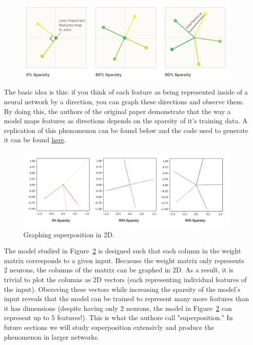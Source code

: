 \documentclass{article} %
\begin{document}
\begin{figure}[h]
    \centering
    \includegraphics[width=0.55\linewidth]{section_1/images/section1_anthropic_graphic_.png}
    \captionsetup{font=footnotesize} %
    \label{fig:section1_anthropic}
\end{figure}

The basic idea is this: if you think of each feature as being represented inside of a
neural network by a direction, you can graph these directions and observe them.
By doing this, the authors of the original paper demonstrate that the way
a model maps features as directions depends on the sparsity of it's training data.
A replication of this phenomenon can be found below and the code used to 
generate it can be found 
\href{https://github.com/zroe1/toy_models_of_superposition/blob/main/section_1/section_1.ipynb}{here}.\\ 

\begin{figure}[h]
    \centering
    \includegraphics[width=0.6\linewidth]{section_1/images/section1_replicated_graphic.png}
    \captionsetup{font=footnotesize} %
    \caption{Graphing superposition in 2D.}
    \label{fig:section1_replication}
\end{figure}

The model studied in  Figure~\ref{fig:section1_replication} is designed such that 
each column in the weight matrix corresponds to a  given input. Becasuse the weight
matrix only represents 2 neurons, the columns of the matrix can be graphed in
2D. As a result, it is trivial to plot the columns as 2D vectors (each representing 
individual features of the input). Obersving these vectors while increasing the 
sparsity of the model's input reveals
that the model can be trained to represent many more features than it has dimensions
(despite having only 2 neurons, the model in Figure~\ref{fig:section1_replication} 
can represent up to 5 features!). This is what the authors call "superposition." In 
future sections we will study superposition extensivly and produce the phenomenon
in larger networks.
\end{document}

